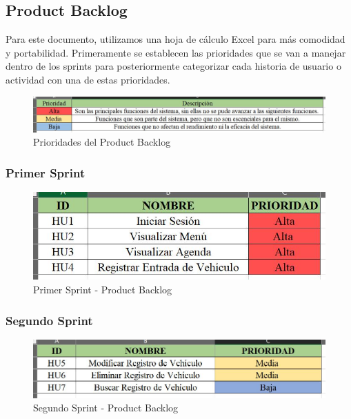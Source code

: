 \subsection{Product Backlog}
Para este documento, utilizamos una hoja de cálculo Excel para más comodidad y portabilidad. Primeramente se establecen las prioridades que se van a manejar dentro de los sprints para posteriormente categorizar cada historia de usuario o actividad con una de estas prioridades.
\begin{figure}[!h]
	\centering
	\includegraphics[width=1\textwidth]{./productBacklog/imagenes/prioridades}
	\caption{Prioridades del Product Backlog}
	\label{fig:Prioridades del Product Backlog}
\end{figure}
\subsubsection{Primer Sprint}
\begin{figure}[!h]
	\centering
	\includegraphics[width=1\textwidth]{./productBacklog/imagenes/primerSprint}
	\caption{Primer Sprint - Product Backlog}
	\label{fig:Primer Sprint - Product Backlog}
\end{figure}
\subsubsection{Segundo Sprint}
\begin{figure}[!h]
	\centering
	\includegraphics[width=1\textwidth]{./productBacklog/imagenes/segundoSprint}
	\caption{Segundo Sprint - Product Backlog}
	\label{fig:egundo Sprint - Product Backlog}
\end{figure}
